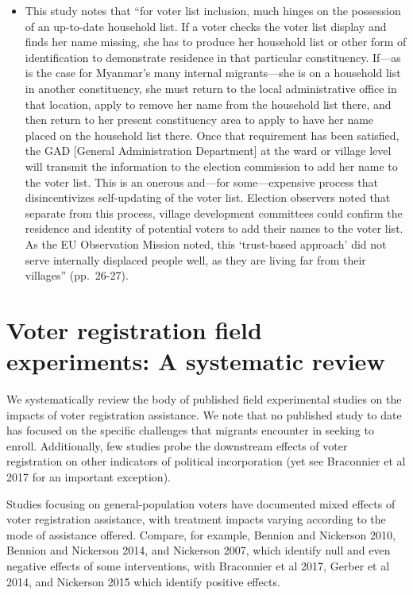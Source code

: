 \documentclass[
  11.5pt,
]{article}
\providecommand{\tightlist}{%
  \setlength{\itemsep}{0pt}\setlength{\parskip}{0pt}}
\begin{document}
\begin{itemize}
  \begin{itemize}
  \tightlist
  \item
    This study notes that ``for voter list inclusion, much hinges on the
    possession of an up-to-date household list. If a voter checks the
    voter list display and finds her name missing, she has to produce
    her household list or other form of identification to demonstrate
    residence in that particular constituency. If---as is the case for
    Myanmar's many internal migrants---she is on a household list in
    another constituency, she must return to the local administrative
    office in that location, apply to remove her name from the household
    list there, and then return to her present constituency area to
    apply to have her name placed on the household list there. Once that
    requirement has been satisfied, the GAD {[}General Administration
    Department{]} at the ward or village level will transmit the
    information to the election commission to add her name to the voter
    list. This is an onerous and---for some---expensive process that
    disincentivizes self-updating of the voter list. Election observers
    noted that separate from this process, village development
    committees could confirm the residence and identity of potential
    voters to add their names to the voter list. As the EU Observation
    Mission noted, this `trust-based approach' did not serve internally
    displaced people well, as they are living far from their villages''
    (pp.~26-27).
  \end{itemize}
\end{itemize}

\clearpage

\section{Voter registration field experiments: A systematic review}

We systematically review the body of published field experimental
studies on the impacts of voter registration assistance. We note that no
published study to date has focused on the specific challenges that
migrants encounter in seeking to enroll. Additionally, few studies probe
the downstream effects of voter registration on other indicators of
political incorporation (yet see Braconnier et al 2017 for an important
exception).

Studies focusing on general-population voters have documented mixed
effects of voter registration assistance, with treatment impacts varying
according to the mode of assistance offered. Compare, for example,
Bennion and Nickerson 2010, Bennion and Nickerson 2014, and Nickerson
2007, which identify null and even negative effects of some
interventions, with Braconnier et al 2017, Gerber et al 2014, and
Nickerson 2015 which identify positive effects.
\end{document}
